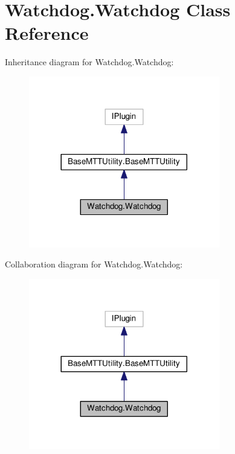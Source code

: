 \hypertarget{classWatchdog_1_1Watchdog}{\section{Watchdog.\-Watchdog Class Reference}
\label{classWatchdog_1_1Watchdog}
}


Inheritance diagram for Watchdog.\-Watchdog\-:
\nopagebreak
\begin{figure}[H]
\begin{center}
\leavevmode
\includegraphics[width=236pt]{classWatchdog_1_1Watchdog__inherit__graph}
\end{center}
\end{figure}


Collaboration diagram for Watchdog.\-Watchdog\-:
\nopagebreak
\begin{figure}[H]
\begin{center}
\leavevmode
\includegraphics[width=236pt]{classWatchdog_1_1Watchdog__coll__graph}
\end{center}
\end{figure}

